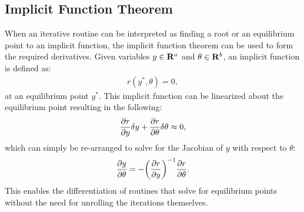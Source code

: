 \subsection{Implicit Function Theorem}
When an iterative routine can be interpreted as finding a root or an equilibrium point to an implicit function, the implicit function theorem can be used to form the required derivatives. Given variables $y \in \mathbf{R}^{a}$ and $\theta \in \mathbf{R}^{b}$, an implicit function is defined as:
\begin{align}
    r(y^*, \theta) = 0,
\end{align}
at an equilibrium point $y^*$. This implicit function can be linearized about the equilibrium point resulting in the following:
\begin{align}
    \frac{\partial { r }}{ \partial { y }} \delta y + \frac{\partial { r }}{ \partial { \theta }} \delta \theta \approx 0 ,
\end{align}
which can simply be re-arranged to solve for the Jacobian of $y$ with respect to $\theta$:
\begin{align}
    \frac{\partial { y }}{ \partial { \theta }} = -\bigg(\frac{\partial { r }}{ \partial { y }} \bigg)^{-1} \frac{\partial { r }}{ \partial { \theta }}. \label{sec:background:ift}
\end{align}
This enables the differentiation of routines that solve for equilibrium points without the need for unrolling the iterations themselves. 
%
